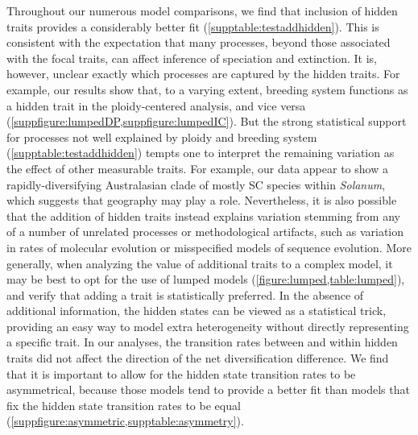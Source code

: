 
Throughout our numerous model comparisons, we find that inclusion of hidden traits provides a considerably better fit (\cref{supptable:testaddhidden}). 
This is consistent with the expectation that many processes, beyond those associated with the focal traits, can affect inference of speciation and extinction. %
It is, however, unclear exactly which processes are captured by the hidden traits.
For example, our results show that, to a varying extent, breeding system functions as a hidden trait in the ploidy-centered analysis, and vice versa (\cref{suppfigure:lumpedDP,suppfigure:lumpedIC}).
But the strong statistical support for processes not well explained by ploidy and breeding system (\cref{supptable:testaddhidden}) tempts one to interpret the remaining variation as the effect of other measurable traits.
For example, our data appear to show a rapidly-diversifying Australasian clade of mostly SC species within \emph{Solanum}, which suggests that geography may play a role. %
Nevertheless, it is also possible that the addition of hidden traits instead explains variation stemming from any of a number of unrelated processes or methodological artifacts, such as variation in rates of molecular evolution or misspecified models of sequence evolution. %
More generally, when analyzing the value of additional traits to a complex model, it may be best to opt for the use of lumped models (\cref{figure:lumped,table:lumped}), and verify that adding a trait is statistically preferred.
In the absence of additional information, the hidden states can be viewed as a statistical trick, providing an easy way to model extra heterogeneity without directly representing a specific trait.
In our analyses, the transition rates between and within hidden traits did not affect the direction of the net diversification difference. 
We find that it is important to allow for the hidden state transition rates to be asymmetrical, because those models tend to provide a better fit than models that fix the hidden state transition rates to be equal (\cref{suppfigure:asymmetric,supptable:asymmetry}).

